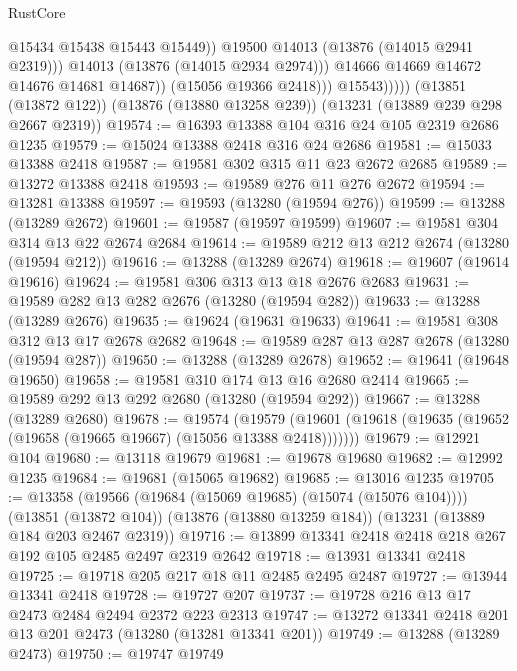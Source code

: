 \begin{lexlean}{RustCore}
\begin{coremodule}
                              @15434
                              @15438
                              @15443
                              @15449))
                          @19500
                          @14013
                          (@13876 (@14015 @2941 @2319)))
                        @14013
                        (@13876 (@14015 @2934 @2974)))
                      @14666
                      @14669
                      @14672
                      @14676
                      @14681
                      @14687))
                  (@15056 @19366 @2418)))
              @15543)))))
    (@13851 (@13872 @122))
    (@13876 (@13880 @13258 @239))
    (@13231 (@13889 @239 @298 @2667 @2319))
@19574 := @16393 @13388 @104 @316 @24 @105 @2319 @2686 @1235
@19579 := @15024 @13388 @2418 @316 @24 @2686
@19581 := @15033 @13388 @2418
@19587 := @19581 @302 @315 @11 @23 @2672 @2685
@19589 := @13272 @13388 @2418
@19593 := @19589 @276 @11 @276 @2672
@19594 := @13281 @13388
@19597 := @19593 (@13280 (@19594 @276))
@19599 := @13288 (@13289 @2672)
@19601 := @19587 (@19597 @19599)
@19607 := @19581 @304 @314 @13 @22 @2674 @2684
@19614 := @19589 @212 @13 @212 @2674 (@13280 (@19594 @212))
@19616 := @13288 (@13289 @2674)
@19618 := @19607 (@19614 @19616)
@19624 := @19581 @306 @313 @13 @18 @2676 @2683
@19631 := @19589 @282 @13 @282 @2676 (@13280 (@19594 @282))
@19633 := @13288 (@13289 @2676)
@19635 := @19624 (@19631 @19633)
@19641 := @19581 @308 @312 @13 @17 @2678 @2682
@19648 := @19589 @287 @13 @287 @2678 (@13280 (@19594 @287))
@19650 := @13288 (@13289 @2678)
@19652 := @19641 (@19648 @19650)
@19658 := @19581 @310 @174 @13 @16 @2680 @2414
@19665 := @19589 @292 @13 @292 @2680 (@13280 (@19594 @292))
@19667 := @13288 (@13289 @2680)
@19678 := @19574
    (@19579 (@19601 (@19618 (@19635 (@19652 (@19658 (@19665 @19667) (@15056 @13388 @2418)))))))
@19679 := @12921 @104
@19680 := @13118 @19679
@19681 := @19678 @19680
@19682 := @12992 @1235
@19684 := @19681 (@15065 @19682)
@19685 := @13016 @1235
@19705 := @13358
    (@19566 (@19684 (@15069 @19685) (@15074 (@15076 @104))))
    (@13851 (@13872 @104))
    (@13876 (@13880 @13259 @184))
    (@13231 (@13889 @184 @203 @2467 @2319))
@19716 := @13899 @13341 @2418 @2418 @218 @267 @192 @105 @2485 @2497 @2319 @2642
@19718 := @13931 @13341 @2418
@19725 := @19718 @205 @217 @18 @11 @2485 @2495 @2487
@19727 := @13944 @13341 @2418
@19728 := @19727 @207
@19737 := @19728 @216 @13 @17 @2473 @2484 @2494 @2372 @223 @2313
@19747 := @13272 @13341 @2418 @201 @13 @201 @2473 (@13280 (@13281 @13341 @201))
@19749 := @13288 (@13289 @2473)
@19750 := @19747 @19749

\end{coremodule}
\end{lexlean}
